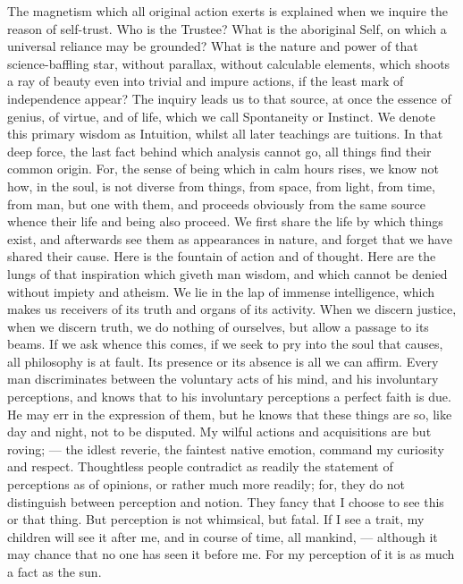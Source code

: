 \documentclass[12pt]{article}
\begin{document}
The magnetism which all original action exerts is explained when we inquire
the reason of self-trust. Who is the Trustee? What is the aboriginal Self,
on which a universal reliance may be grounded? What is the nature and power
of that science-baffling star, without parallax, without calculable
elements, which shoots a ray of beauty even into trivial and impure actions,
if the least mark of independence appear? The inquiry leads us to that
source, at once the essence of genius, of virtue, and of life, which we call
Spontaneity or Instinct. We denote this primary wisdom as Intuition, whilst
all later teachings are tuitions. In that deep force, the last fact behind
which analysis cannot go, all things find their common origin. For, the
sense of being which in calm hours rises, we know not how, in the soul, is
not diverse from things, from space, from light, from time, from man, but
one with them, and proceeds obviously from the same source whence their life
and being also proceed. We first share the life by which things exist, and
afterwards see them as appearances in nature, and forget that we have shared
their cause. Here is the fountain of action and of thought. Here are the
lungs of that inspiration which giveth man wisdom, and which cannot be
denied without impiety and atheism. We lie in the lap of immense
intelligence, which makes us receivers of its truth and organs of its
activity. When we discern justice, when we discern truth, we do nothing of
ourselves, but allow a passage to its beams. If we ask whence this comes, if
we seek to pry into the soul that causes, all philosophy is at fault. Its
presence or its absence is all we can affirm. Every man discriminates
between the voluntary acts of his mind, and his involuntary perceptions, and
knows that to his involuntary perceptions a perfect faith is due. He may err
in the expression of them, but he knows that these things are so, like day
and night, not to be disputed. My wilful actions and acquisitions are but
roving; --- the idlest reverie, the faintest native emotion, command my
curiosity and respect. Thoughtless people contradict as readily the
statement of perceptions as of opinions, or rather much more readily; for,
they do not distinguish between perception and notion. They fancy that I
choose to see this or that thing. But perception is not whimsical, but
fatal. If I see a trait, my children will see it after me, and in course of
time, all mankind, --- although it may chance that no one has seen it before
me. For my perception of it is as much a fact as the sun.
\end{document}
